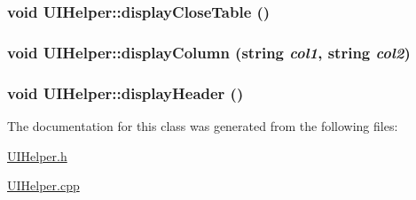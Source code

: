 \hypertarget{class_u_i_helper_dac3e7eda05dfd140c77278ab46fcd6d}{
\subsubsection[displayCloseTable]{\setlength{\rightskip}{0pt plus 5cm}void UIHelper::display\-Close\-Table ()}}
\label{class_u_i_helper_dac3e7eda05dfd140c77278ab46fcd6d}


\hypertarget{class_u_i_helper_4da5ae4ff9d2936bcb7463a79b4695be}{
\subsubsection[displayColumn]{\setlength{\rightskip}{0pt plus 5cm}void UIHelper::display\-Column (string {\em col1}, string {\em col2})}}
\label{class_u_i_helper_4da5ae4ff9d2936bcb7463a79b4695be}


\hypertarget{class_u_i_helper_626a53a3308909e66c67873826055ff9}{
\subsubsection[displayHeader]{\setlength{\rightskip}{0pt plus 5cm}void UIHelper::display\-Header ()}}
\label{class_u_i_helper_626a53a3308909e66c67873826055ff9}




The documentation for this class was generated from the following files:\begin{CompactItemize}
\item 
\hyperlink{_u_i_helper_8h}{UIHelper.h}\item 
\hyperlink{_u_i_helper_8cpp}{UIHelper.cpp}\end{CompactItemize}
